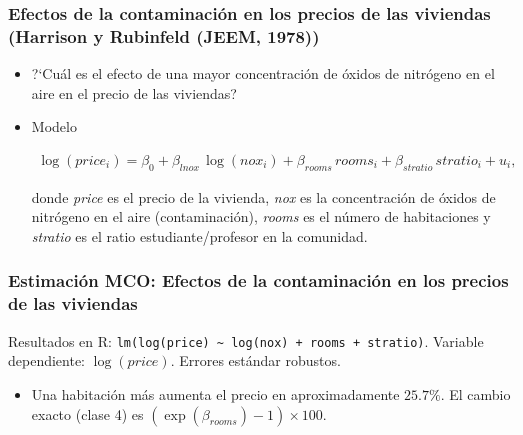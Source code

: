 \documentclass[t, compress, spanish, aspectratio=169]{beamer}
\begin{document}
\begin{frame}
	\frametitle{Efectos de la contaminaci\'on en los precios de las viviendas (Harrison y Rubinfeld (JEEM, 1978))}
	\begin{itemize}
		\item ?`Cu\'al es el efecto de una mayor concentraci\'on de \'oxidos de nitr\'ogeno en el aire en el precio de las viviendas?
            \item Modelo 
            \begin{small}            
            \begin{align*}
            \log(price_i)  = \beta_0 +\beta_{lnox} \,\log(nox_i) +\beta_{rooms}\, rooms_i + \beta_{stratio} \,stratio_i +u_i,
            \end{align*}
            \end{small}
            donde \emph{price} es el precio de la vivienda, \emph{nox} es la concentraci\'on de \'oxidos de nitr\'ogeno en el aire (contaminaci\'on), \emph{rooms} es el n\'umero de habitaciones y \emph{stratio} es el ratio estudiante/profesor en la comunidad.
	\end{itemize}
\end{frame}
\begin{frame}
\frametitle{Estimaci\'on MCO: Efectos de la contaminaci\'on en los precios de las viviendas}
Resultados en R: \texttt{lm(log(price) \textasciitilde{} log(nox) + rooms + stratio)}. Variable dependiente: $\log(price)$. Errores est\'andar robustos.
\medskip
\begin{center}
\footnotesize

\end{center}
\begin{itemize}
    \item Una habitaci\'on m\'as aumenta el precio en aproximadamente $25.7\%$. El cambio exacto (clase 4) es $(\exp(\beta_{rooms})-1)\times 100$.
\end{itemize}
\end{frame}
\end{document}
